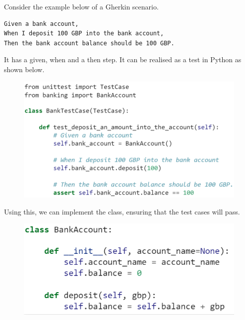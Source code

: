 \documentclass[a4paper, openany]{memoir}
\begin{document}
Consider the example below of a Gherkin scenario.
\begin{verbatim}
Given a bank account,
When I deposit 100 GBP into the bank account,
Then the bank account balance should be 100 GBP.
\end{verbatim}
It has a given, when and a then step. It can be realised as a test in Python as shown below.
\begin{figure}[H]
    \centering
    \includegraphics[scale=0.6]{src/11 BDD Python naive test.PNG}
\end{figure}
\noindent Using this, we can implement the class, ensuring that the test cases will pass.
\begin{figure}[H]
    \centering
    \includegraphics[scale=0.6]{src/11 BDD Python implementation.PNG}
\end{figure}
\end{document}
